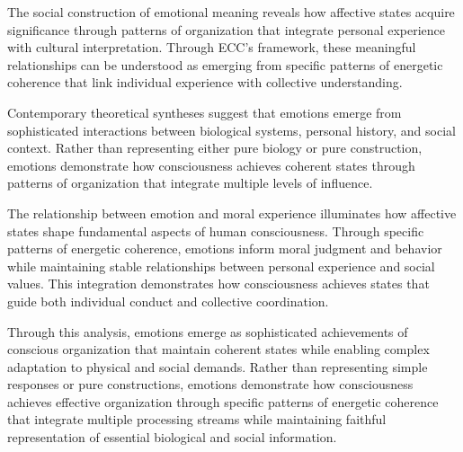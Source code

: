 The social construction of emotional meaning \cite{White1994} reveals how affective states acquire significance through patterns of organization that integrate personal experience with cultural interpretation. Through ECC's framework, these meaningful relationships can be understood as emerging from specific patterns of energetic coherence that link individual experience with collective understanding.

Contemporary theoretical syntheses \cite{Wentworth1992} suggest that emotions emerge from sophisticated interactions between biological systems, personal history, and social context. Rather than representing either pure biology or pure construction, emotions demonstrate how consciousness achieves coherent states through patterns of organization that integrate multiple levels of influence.

The relationship between emotion and moral experience \cite{LeDoux2015} illuminates how affective states shape fundamental aspects of human consciousness. Through specific patterns of energetic coherence, emotions inform moral judgment and behavior while maintaining stable relationships between personal experience and social values. This integration demonstrates how consciousness achieves states that guide both individual conduct and collective coordination.

Through this analysis, emotions emerge as sophisticated achievements of conscious organization that maintain coherent states while enabling complex adaptation to physical and social demands. Rather than representing simple responses or pure constructions, emotions demonstrate how consciousness achieves effective organization through specific patterns of energetic coherence that integrate multiple processing streams while maintaining faithful representation of essential biological and social information.